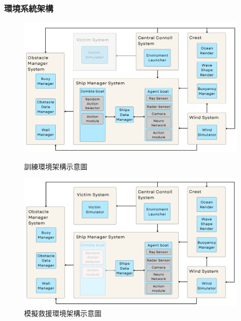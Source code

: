 \documentclass[12pt,a4paper]{article}
\begin{document}
\subsubsection{環境系統架構}
\begin{figure}[h]
    \centering
    \includegraphics[scale=0.381]{image/TrainingArchitecture.png}
    \caption{訓練環境架構示意圖}
    \label{fig:training_env}

	\vspace*{0.3cm}

    \includegraphics[scale=0.381]{image/SimulationArchitecture.png}
    \caption{模擬救援環境架構示意圖}
    \label{fig:simulation_env}
\end{figure}



\newpage
\end{document}
